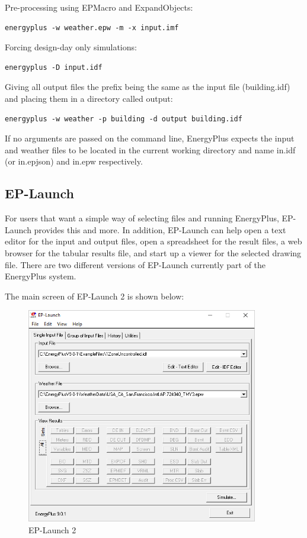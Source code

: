 Pre-processing using EPMacro and ExpandObjects:
\begin{verbatim}
energyplus -w weather.epw -m -x input.imf
\end{verbatim}
Forcing design-day only simulations:
\begin{verbatim}
energyplus -D input.idf
\end{verbatim}
Giving all output files the prefix being the same as the input file
(building.idf) and placing them in a directory called output:
\begin{verbatim}
energyplus -w weather -p building -d output building.idf
\end{verbatim}
If no arguments are passed on the command line, EnergyPlus expects
the input and weather files to be located in the current working directory
and name in.idf (or in.epjson) and in.epw respectively.

\subsection*{EP-Launch}

For users that want a simple way of selecting files and running EnergyPlus,
EP-Launch provides this and more. In addition, EP-Launch can help
open a text editor for the input and output files, open a spreadsheet
for the result files, a web browser for the tabular results file,
and start up a viewer for the selected drawing file. There are two
different versions of EP-Launch currently part of the EnergyPlus system. 

The main screen of EP-Launch 2 is shown below:


\begin{figure}[hbtp] 
\centering
\includegraphics[width=0.9\textwidth, height=0.9\textheight, keepaspectratio=true]{media/eplaunch2.png}
\caption{EP-Launch 2}
\end{figure}


